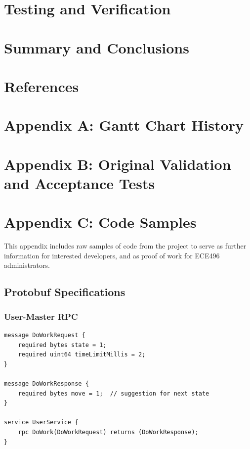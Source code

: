 \documentclass[pdftex,12pt,a4paper]{article}
\begin{document}
%
%
%
\section{Testing and Verification}

%
%
%
\section{Summary and Conclusions}

%
%
%
\pagebreak
\section{References}

%
%
%
\pagebreak
\section{Appendix A: Gantt Chart History}

%
%
%
\pagebreak
\section{Appendix B: Original Validation and Acceptance Tests}

%
%
\pagebreak
\section{Appendix C: Code Samples}

This appendix includes raw samples of code from the project to serve as further information for interested developers, and as proof of work for ECE496 administrators.

\subsection{Protobuf Specifications}\label{sec:protobuf-sample}

\subsubsection*{User-Master RPC}
\begin{framed}
\begin{lstlisting}
message DoWorkRequest {
    required bytes state = 1;
    required uint64 timeLimitMillis = 2;
}

message DoWorkResponse {
    required bytes move = 1;  // suggestion for next state
}

service UserService {
    rpc DoWork(DoWorkRequest) returns (DoWorkResponse);
}
\end{lstlisting}
\end{framed}
\end{document}
